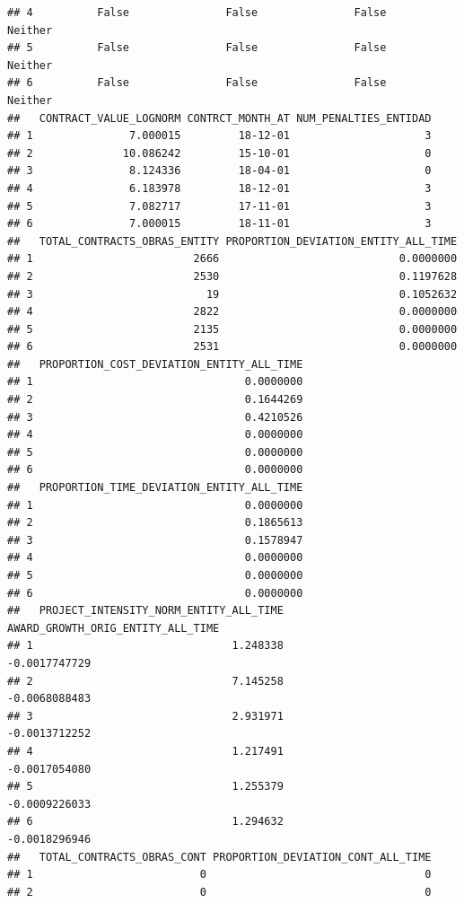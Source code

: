 \documentclass[
]{article}
\begin{document}
\begin{verbatim}
## 4          False               False               False             Neither
## 5          False               False               False             Neither
## 6          False               False               False             Neither
##   CONTRACT_VALUE_LOGNORM CONTRCT_MONTH_AT NUM_PENALTIES_ENTIDAD
## 1               7.000015         18-12-01                     3
## 2              10.086242         15-10-01                     0
## 3               8.124336         18-04-01                     0
## 4               6.183978         18-12-01                     3
## 5               7.082717         17-11-01                     3
## 6               7.000015         18-11-01                     3
##   TOTAL_CONTRACTS_OBRAS_ENTITY PROPORTION_DEVIATION_ENTITY_ALL_TIME
## 1                         2666                            0.0000000
## 2                         2530                            0.1197628
## 3                           19                            0.1052632
## 4                         2822                            0.0000000
## 5                         2135                            0.0000000
## 6                         2531                            0.0000000
##   PROPORTION_COST_DEVIATION_ENTITY_ALL_TIME
## 1                                 0.0000000
## 2                                 0.1644269
## 3                                 0.4210526
## 4                                 0.0000000
## 5                                 0.0000000
## 6                                 0.0000000
##   PROPORTION_TIME_DEVIATION_ENTITY_ALL_TIME
## 1                                 0.0000000
## 2                                 0.1865613
## 3                                 0.1578947
## 4                                 0.0000000
## 5                                 0.0000000
## 6                                 0.0000000
##   PROJECT_INTENSITY_NORM_ENTITY_ALL_TIME AWARD_GROWTH_ORIG_ENTITY_ALL_TIME
## 1                               1.248338                     -0.0017747729
## 2                               7.145258                     -0.0068088483
## 3                               2.931971                     -0.0013712252
## 4                               1.217491                     -0.0017054080
## 5                               1.255379                     -0.0009226033
## 6                               1.294632                     -0.0018296946
##   TOTAL_CONTRACTS_OBRAS_CONT PROPORTION_DEVIATION_CONT_ALL_TIME
## 1                          0                                  0
## 2                          0                                  0

\end{verbatim}
\end{document}

